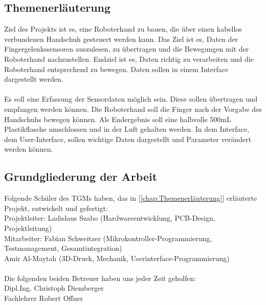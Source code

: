 \documentclass[titlepage,12pt,twoside]{article}
\begin{document}
\subsection{Themenerläuterung}
\label{chap:Themenerläuterung}
Ziel des Projekts ist es, eine Roboterhand zu bauen, die über einen kabellos verbundenen
Handschuh gesteuert werden kann. Das Ziel ist es, Daten der Fingergelenkssensoren auszulesen,
zu übertragen und die Bewegungen mit der Roboterhand nachzustellen. Endziel ist es, Daten
richtig zu verarbeiten und die Roboterhand entsprechend zu bewegen. Daten sollen in einem
Interface dargestellt werden. \\
\\
Es soll eine Erfassung der Sensordaten möglich sein. Diese sollen übertragen und empfangen
werden können. Die Roboterhand soll die Finger nach der Vorgabe des Handschuhs bewegen
können. Als Endergebnis soll eine halbvolle 500mL Plastikflasche umschlossen und in der Luft
gehalten werden. In dem Interface, dem User-Interface, sollen wichtige Daten dargestellt und
Parameter verändert werden können. \\

\subsection{Grundgliederung der Arbeit}
\label{chap:Grundgliederung der Arbeit}
Folgende Schüler des TGMs haben, das in [\textcolor{blue}{\autoref{chap:Themenerläuterung}}] erläuterte Projekt, entwickelt und gefertigt: \hfill \break
\\
Projektleiter:    Ladislaus Szabo (Hardwareentwicklung, PCB-Design, Projektleitung)\\
Mitarbeiter: Fabian Schweitzer (Mikrokontroller-Programmierung, Testmanagement, Gesamtintegration)\\
Amir Al-Maytah (3D-Druck, Mechanik, Userinterface-Programmierung) 
\\
\\
Die folgenden beiden Betreuer haben uns jeder Zeit geholfen:
\\
Dipl.Ing. Christoph Diemberger \\
Fachlehrer Robert Offner
\end{document}
